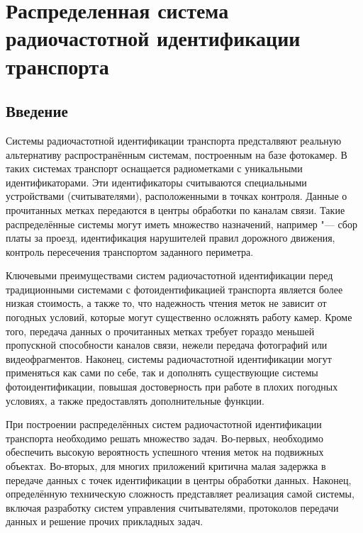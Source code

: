 \chapter{Распределенная система радиочастотной идентификации транспорта}\label{ch:ch1}


\section{Введение}\label{sec:ch1_intro}

Системы радиочастотной идентификации транспорта предсталвяют реальную альтернативу распространённым системам, построенным на базе фотокамер. В таких системах транспорт оснащается радиометками с уникальными идентификаторами. Эти идентификаторы считываются специальными устройствами (считывателями), расположенными в точках контроля. Данные о прочитанных метках передаются в центры обработки по каналам связи. Такие распределённые системы могут иметь множество назначений, например "--- сбор платы за проезд, идентификация нарушителей правил дорожного движения, контроль пересечения транспортом заданного периметра.

Ключевыми преимуществами систем радиочастотной идентификации перед традиционными системами с фотоидентификацией транспорта является более низкая стоимость, а также то, что надежность чтения меток не зависит от погодных условий, которые могут существенно осложнять работу камер. Кроме того, передача данных о прочитанных метках требует гораздо меньшей пропускной способности каналов связи, нежели передача фотографий или видеофрагментов. Наконец, системы радиочастотной идентификации могут применяться как сами по себе, так и дополнять существующие системы фотоидентификации, повышая достоверность при работе в плохих погодных условиях, а также предоставлять дополнительные функции.

При построении распределённых систем радиочастотной идентификации транспорта необходимо решать множество задач. Во-первых, необходимо обеспечить высокую вероятность успешного чтения меток на подвижных объектах. Во-вторых, для многих приложений критична малая задержка в передаче данных с точек идентификации в центры обработки данных. Наконец, определённую техническую сложность представляет реализация самой системы, включая разработку систем управления считывателями, протоколов передачи данных и решение прочих прикладных задач.

